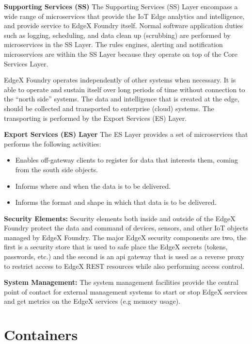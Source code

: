 \textbf{Supporting Services (SS)}
The Supporting Services (SS) Layer encompass a wide range of microservices that provide the IoT Edge analytics and intelligence, and provide service to EdgeX Foundry itself. Normal software application duties such as logging, scheduling, and data clean up (scrubbing) are performed by microservices in the SS Layer. The rules engines, alerting and notification microservices are within the SS Layer because they operate on top of the Core Services Layer. 

EdgeX Foundry operates independently of other systems when necessary. It is able to operate and sustain itself over long periods of time without connection to the “north side” systems. The data and intelligence that is created at the edge, should be collected and transported to enterprise (cloud) systems. The transporting is performed by the Export Services (ES) Layer.

\textbf{Export Services (ES) Layer}
The ES Layer provides a set of microservices that performs the following activities:
\begin{itemize}
    \item Enables off-gateway clients to register for data that interests them, coming from the south side objects.
    \item Informs where and when the data is to be delivered.
    \item Informs the format and shape in which that data is to be delivered.
\end{itemize}

\textbf{Security Elements:}
Security elements both inside and outside of the EdgeX Foundry protect the data and command of devices, sensors, and other IoT objects managed by EdgeX Foundry. The major EdgeX security components are two, the first is a security store that is used to safe place the EdgeX secrets (tokens, passwords, etc.) and the second is an \acrfull{api} gateway that is used as a reverse proxy to restrict access to EdgeX REST resources while also performing access control.

\textbf{System Management:}
The system management facilities provide the central point of contact for external management systems to start or stop EdgeX services and get metrics on the EdgeX services (e.g memory usage).

\section{Containers} \label{st:containers}

